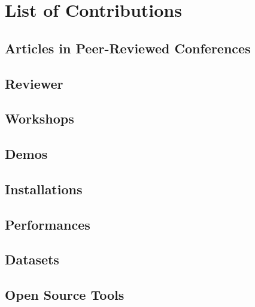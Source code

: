 \chapter{List of Contributions}\label{app_D:pubs}


\section{Articles in Peer-Reviewed Conferences}

\section{Reviewer}



\section{Workshops}

\section{Demos}



\section{Installations}



\section{Performances}



\section{Datasets}


\section{Open Source Tools} \label{app_E:OpenTools}
